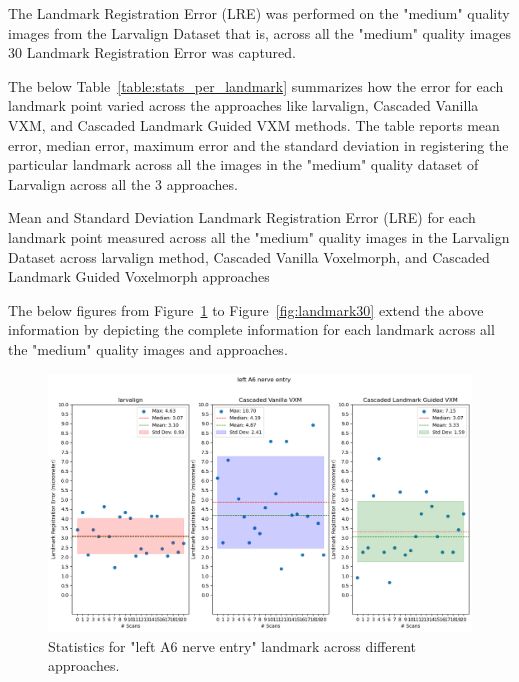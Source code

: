 \documentclass{report}
\begin{document}
	The Landmark Registration Error (LRE) was performed on the "medium" quality images from the Larvalign Dataset that is, across all the "medium" quality images 30 Landmark Registration Error was captured.
	
	The below Table~\ref{table:stats_per_landmark} summarizes how the error for each landmark point varied across the approaches like larvalign, Cascaded Vanilla VXM, and Cascaded Landmark Guided VXM methods. The table reports mean error, median error, maximum error and the standard deviation in registering the particular landmark across all the images in the "medium" quality dataset of Larvalign across all the 3 approaches.
	
	\begin{table}[h]
		\centering
		
		\caption{Mean and Standard Deviation Landmark Registration Error (LRE) for each landmark point measured across all the "medium" quality images in the Larvalign Dataset across larvalign method, Cascaded Vanilla Voxelmorph, and Cascaded Landmark Guided Voxelmorph approaches}
		\label{table:stats_per_landmark}
	\end{table}
	
	The below figures from Figure~\ref{fig:landmark1} to Figure~\ref{fig:landmark30} extend the above information by depicting the complete information for each landmark across all the "medium" quality images and approaches.
	

\begin{figure}[h!]
	\centering
	\includegraphics[width=0.7\columnwidth]{resources/chapter5_fresh/output/left A6 nerve entry.png}
	\caption{Statistics for "left A6 nerve entry" landmark across different approaches.}
	\label{fig:landmark1}
\end{figure}
\end{document}
